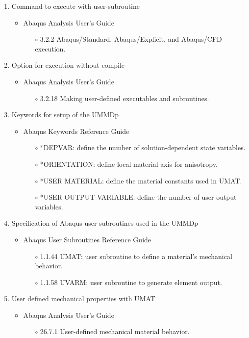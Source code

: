 \documentclass[11pt,a4paper,twoside,final,onecolumn,titlepage]{article}
\begin{document}
\begin{enumerate}
	\item Command to execute with user-subroutine
	 \begin{itemize}
     	\item Abaqus Analysis User's Guide
     	\begin{itemize}
     		\item[$\circ$] 3.2.2 Abaqus/Standard, Abaqus/Explicit, and Abaqus/CFD execution.
		\end{itemize}     	 
  	\end{itemize}
  	\item Option for execution without compile
  	\begin{itemize}
     	\item Abaqus Analysis User's Guide
     	\begin{itemize}
     		\item[$\circ$] 3.2.18 Making user-defined executables and subroutines.
		\end{itemize}     
  	\end{itemize}
  	 \item Keywords for setup of the UMMDp
  	\begin{itemize}
     	\item Abaqus Keywords Reference Guide
     	\begin{itemize}
     		\item[$\circ$] *DEPVAR: define the number of solution-dependent state variables.
     		\item[$\circ$] *ORIENTATION: define local material axis for anisotropy.
     		\item[$\circ$] *USER MATERIAL: define the material constants used in UMAT.
     		\item[$\circ$] *USER OUTPUT VARIABLE: define the number of user output variables.
     	\end{itemize}
  	\end{itemize}
  	 \item Specification of Abaqus user subroutines used in the UMMDp
  	\begin{itemize}
     	\item Abaqus User Subroutines Reference Guide
     	\begin{itemize}
     		\item[$\circ$] 1.1.44 UMAT: user subroutine to define a material's mechanical behavior.
     		\item[$\circ$] 1.1.58 UVARM: user subroutine to generate element output.
     	\end{itemize}
  	\end{itemize}
  	 \item User defined mechanical properties with UMAT
  	 \begin{itemize}
    	 \item Abaqus Analysis User's Guide
     	\begin{itemize}
     		\item[$\circ$] 26.7.1 User-defined mechanical material behavior.
     	\end{itemize}
  	\end{itemize}
\end{enumerate}
\end{document}

